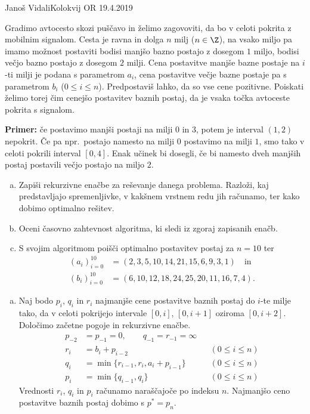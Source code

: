 \begin{naloga}{Janoš Vidali}{Kolokvij OR 19.4.2019}
\begin{vprasanje}
Gradimo avtocesto skozi puščavo in želimo zagovoviti,
da bo v celoti pokrita z mobilnim signalom.
Cesta je ravna in dolga $n$ milj ($n \in \Z$),
na vsako miljo pa imamo možnost postaviti
bodisi manjšo bazno postajo z dosegom $1$ miljo,
bodisi večjo bazno postajo z dosegom $2$ milji.
Cena postavitve manjše bazne postaje na $i$-ti milji
je podana s parametrom $a_i$,
cena postavitve večje bazne postaje pa s parametrom $b_i$ ($0 \le i \le n$).
Predpostaviš lahko, da so vse cene pozitivne.
Poiskati želimo torej čim cenejšo postavitev baznih postaj,
da je vsaka točka avtoceste pokrita s signalom.

\medskip
\noindent
{\bf Primer:} če postavimo manjši postaji na milji $0$ in $3$,
potem je interval $(1, 2)$ nepokrit.
Če pa npr.~postajo namesto na milji $0$ postavimo na milji $1$,
smo tako v celoti pokrili interval $[0, 4]$.
Enak učinek bi dosegli,
če bi namesto dveh manjših postaj postavili večjo postajo na miljo $2$.

\begin{enumerate}[(a)]
\item Zapiši rekurzivne enačbe za reševanje danega problema.
Razloži, kaj pred\-stav\-lja\-jo spremenljivke,
v kakšnem vrstnem redu jih računamo,
ter kako dobimo optimalno rešitev.

\item Oceni časovno zahtevnost algoritma, ki sledi iz zgoraj zapisanih enačb.

\item S svojim algoritmom poišči optimalno postavitev postaj za $n = 10$ ter
\begin{align*}
(a_i)_{i=0}^{10} &= (2,  3,  5, 10, 14, 21, 15,  6,  9,  3,  1)
\quad \text{in} \\
(b_i)_{i=0}^{10} &= (6, 10, 12, 18, 24, 25, 20, 11, 16,  7,  4) .
\end{align*}
\end{enumerate}
\end{vprasanje}

\begin{odgovor}
\begin{enumerate}[(a)]
\item Naj bodo $p_i$, $q_i$ in $r_i$
najmanjše cene postavitve baznih postaj do $i$-te milje tako,
da v celoti pokrijejo intervale $[0, i]$, $[0, i+1]$ oziroma $[0, i+2]$.
Določimo začetne pogoje in rekurzivne enačbe.
\begin{align*}
p_{-2} &= p_{-1} = 0, \qquad q_{-1} = r_{-1} = \infty \\
r_i &= b_i + p_{i-2} && (0 \le i \le n) \\
q_i &= \min\{r_{i-1}, r_i, a_i + p_{i-1}\} && (0 \le i \le n) \\
p_i &= \min\{q_{i-1}, q_i\} && (0 \le i \le n)
\end{align*}
Vrednosti $r_i$, $q_i$ in $p_i$ računamo naraščajoče po indeksu $n$.
Najmanjšo ceno postavitve baznih postaj dobimo s $p^* = p_n$.


\end{enumerate}
\end{odgovor}
\end{naloga}
